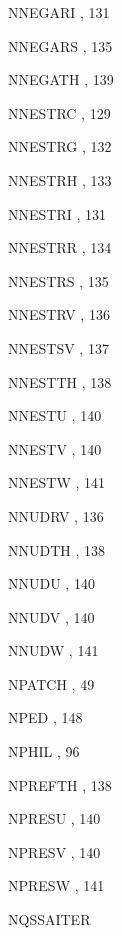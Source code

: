 \begin{theindex}
  \item NNEGARI
    \subitem {},  131
  \item NNEGARS
    \subitem {},  135
  \item NNEGATH
    \subitem {},  139
  \item NNESTRC
    \subitem {},  129
  \item NNESTRG
    \subitem {},  132
  \item NNESTRH
    \subitem {},  133
  \item NNESTRI
    \subitem {},  131
  \item NNESTRR
    \subitem {},  134
  \item NNESTRS
    \subitem {},  135
  \item NNESTRV
    \subitem {},  136
  \item NNESTSV
    \subitem {},  137
  \item NNESTTH
    \subitem {},  138
  \item NNESTU
    \subitem {},  140
  \item NNESTV
    \subitem {},  140
  \item NNESTW
    \subitem {},  141
  \item NNUDRV
    \subitem {},  136
  \item NNUDTH
    \subitem {},  138
  \item NNUDU
    \subitem {},  140
  \item NNUDV
    \subitem {},  140
  \item NNUDW
    \subitem {},  141
  \item NPATCH
    \subitem {},  49
  \item NPED
    \subitem {},  148
  \item NPHIL
    \subitem {},  96
  \item NPREFTH
    \subitem {},  138
  \item NPRESU
    \subitem {},  140
  \item NPRESV
    \subitem {},  140
  \item NPRESW
    \subitem {},  141
  \item NQSSAITER

\end{theindex}
